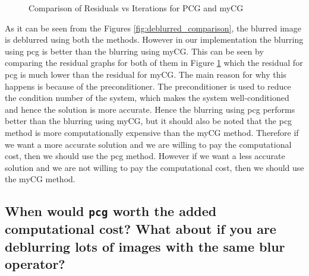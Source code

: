 \documentclass[unicode,11pt,a4paper,oneside,numbers=endperiod,openany]{scrartcl}
\begin{document}
\begin{figure}[H]
    \centering
    \hfill
    \caption{Comparison of Residuals vs Iterations for PCG and myCG}
    \label{fig:residuals_comparison}
\end{figure}

As it can be seen from the Figures \ref{fig:deblurred_comparison}, the blurred image is deblurred using both the methods. However in our implementation the blurring using pcg is better than the blurring using myCG. This can be seen by comparing the residual graphs for both of them in Figure \ref{fig:residuals_comparison} which the residual for pcg is much lower than the residual for myCG. The main reason for why this happens is because of the preconditioner. The preconditioner is used to reduce the condition number of the system, which makes the system well-conditioned and hence the solution is more accurate. Hence the blurring using pcg performs better than the blurring using myCG, but it should also be noted that the pcg method is more computationally expensive than the myCG method. Therefore if we want a more accurate solution and we are willing to pay the computational cost, then we should use the pcg method. However if we want a less accurate solution and we are not willing to pay the computational cost, then we should use the myCG method.
\subsection{When would \texttt{pcg} worth the added computational cost? What about if you are deblurring lots of images with the same blur operator?}
\end{document}
